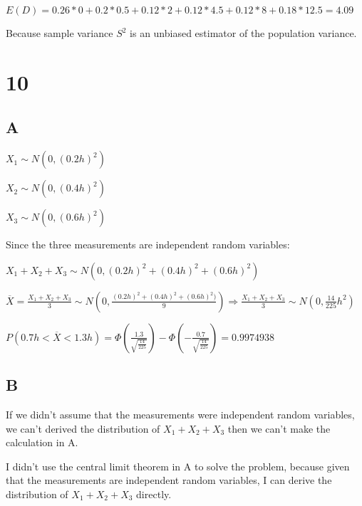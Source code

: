\documentclass{article}
\begin{document}
	$E(D)=0.26*0+0.2*0.5+0.12*2+0.12*4.5+0.12*8+0.18*12.5=4.09$
	
	Because sample variance $S^2$ is an unbiased estimator of the population variance.
	
	\section*{10}
	
	\subsection*{A}\noindent
	
	$X_1\sim N(0,(0.2h)^2)$
	
	$X_2\sim N(0,(0.4h)^2)$
	
	$X_3\sim N(0,(0.6h)^2)$
	
	Since the three measurements are independent random variables:
	
	$X_1+X_2+X_3\sim N(0,(0.2h)^2+(0.4h)^2+(0.6h)^2)$
	
	$\overline{X}=\frac{X_1+X_2+X_3}{3}\sim N(0,\frac{(0.2h)^2+(0.4h)^2+(0.6h)^2)}{9})\Rightarrow \frac{X_1+X_2+X_3}{3}\sim N(0,\frac{14}{225}h^2)$
	
	$P(0.7h<\overline{X}<1.3h)=\Phi(\frac{1.3}{\sqrt{\frac{14}{225}}})-\Phi(-\frac{0.7}{\sqrt{\frac{14}{225}}})= 0.9974938$
	
	\subsection*{B}
	
	If we didn't assume that the measurements were independent random variables, we can't derived the distribution of $X_1+X_2+X_3$ then we can't make the calculation in A.
	
	I didn't use the central limit theorem in A to solve the problem, because given that the measurements are independent random variables, I can derive the distribution of $X_1+X_2+X_3$ directly.
	
	
\end{document}
